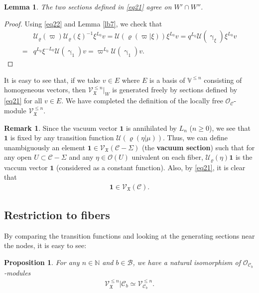 \documentclass[11pt,b5paper,notitlepage]{article}
\theoremstyle{definition}
\newtheorem{rem}[df]{Remark}
\theoremstyle{plain}
\newtheorem{pp}[df]{Proposition}
\newtheorem{lm}[df]{Lemma}
\newcommand{\fk}{\mathfrak}
\newcommand{\mc}{\mathcal}
\newcommand{\id}{\mathbf{1}}
\newcommand{\scr}{\mathscr}
\newcommand{\Vbb}{\mathbb V}
\newcommand{\Nbb}{\mathbb N}
\numberwithin{equation}{section}
\begin{document}
\begin{lm}
	The two sections defined in \eqref{eq21} agree on $W'\cap W''$.
\end{lm}


\begin{proof}
Using   \eqref{eq22} and Lemma \ref{lb7}, we check that
	\begin{align*}
	&\mc U_\varrho(\varpi)\mc U_\varrho(\xi)^{-1}\xi^{L_0}v=\mc U(\varrho(\varpi|\xi))\xi^{L_0}v=q^{L_0}\mc U(\upgamma_{\xi})\xi^{L_0}v\\
	=&q^{L_0}\xi^{-L_0}\mc U(\upgamma_1)v=\varpi^{L_0}\mc U(\upgamma_1)v.
	\end{align*}
\end{proof}

It is easy to see that, if we take $v\in E$ where $E$ is a basis of $\Vbb^{\leq n}$ consisting of homogeneous vectors, then $\scr V_{\fk X}^{\leq n}|_{W}$ is generated freely by sections defined by \eqref{eq21} for all $v\in E$. We have completed the definition of the  locally free $\scr O_{\mc C}$-module $\scr V_{\fk X}^{\leq n}$.



\begin{rem}
Since the vacuum vector $\id$ is annihilated by $L_n$ ($n\geq 0$), we see that $\id$ is fixed by any transition function $\mc U(\varrho(\eta|\mu))$. Thus, we can define unambiguously an element $\id\in\scr V_{\fk X}(\mc C-\Sigma)$ (the \textbf{vacuum section}) such that for any open $U\subset\mc C-\Sigma$ and any $\eta\in\scr O(U)$ univalent on each fiber, $\mc U_\varrho(\eta)\id$ is the vaccum vector $\id$ (considered as a constant function). \index{1@$\id$} Also, by \eqref{eq21}, it is clear that
\begin{align*}
	\id\in\scr V_{\fk X}(\mc C).
\end{align*}
\end{rem}





\subsection*{Restriction to fibers}


By comparing the transition functions and looking at the generating sections near the nodes, it is easy to see:

\begin{pp}\label{lb10}
For any $n\in\Nbb$ and $b\in\mc B$, we have a natural isomorphism of $\scr O_{\mc C_b}$-modules
\begin{align*}
\scr V_{\fk X}^{\leq n}|\mc C_b\simeq\scr V_{\mc C_b}^{\leq n}.
\end{align*}
\end{pp}
\end{document}
